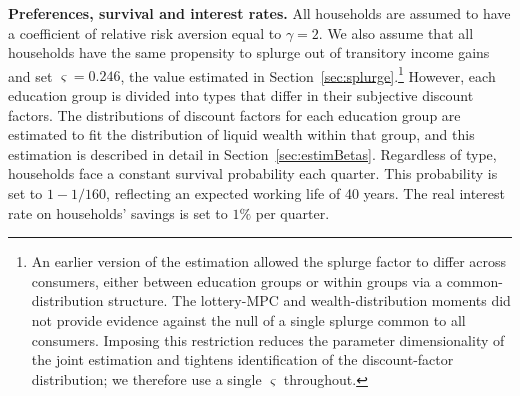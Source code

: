 \documentclass[qe,draft]{econsocart}
\theoremstyle{plain}
\theoremstyle{definition}
\begin{document}
\textbf{Preferences, survival and interest rates.} All households are assumed to have a coefficient of relative risk aversion equal to $\gamma=2$.
We also assume that all households have the same propensity to splurge out of transitory income gains and set $\varsigma=0.246$, the value estimated in Section~\ref{sec:splurge}.\footnote{An earlier version of the estimation allowed the splurge factor to differ across consumers, either between education groups or within groups via a common-distribution structure. The lottery-MPC and wealth-distribution moments did not provide evidence against the null of a single splurge common to all consumers. Imposing this restriction reduces the parameter dimensionality of the joint estimation and tightens identification of the discount-factor distribution; we therefore use a single $\varsigma$ throughout.}
However, each education group is divided into types that differ in their subjective discount factors.
The distributions of discount factors for each education group are estimated to fit the distribution of liquid wealth within that group, and this estimation is described in detail in Section~\ref{sec:estimBetas}.
Regardless of type, households face a constant survival probability each quarter.
This probability is set to $1-1/160$, reflecting an expected working life of 40 years.
The real interest rate on households' savings is set to $1\%$ per quarter.
\end{document}
